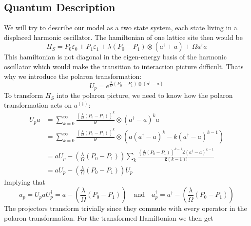 	\subsection{Quantum Description}
	We will try to describe our model as a two state system, each state living in a displaced harmonic oscillator. The hamiltonian of one lattice site then would be
	\begin{equation}
		H_S =	P_0 \varepsilon_0 + P_1 \varepsilon_1 + \lambda (P_0 - P_1) \otimes (a^\dagger  + a) + \Omega a^\dagger a
	\end{equation}
	This hamiltonian is not diagonal in the eigen-energy basis of the harmonic oscillator which would make the transition to interaction picture difficult. Thats why we introduce the polaron transformation:
	\begin{equation}
		U_p =	e^{\frac{\lambda}{\Omega} (P_0 - P_1) \otimes (a^\dagger - a)}
	\end{equation}
	To transform $H_S$ into the polaron picture, we need to know how the polaron transformation acts on $a^{(\dagger)}$:
	\begin{align}
		U_p a &=	\sum_{k=0}^{\infty} \frac{\left(\frac{\lambda}{\Omega} (P_0 - P_1)\right)^k }{k!} \otimes (a^{\dagger} - a)^k a \\
		&=	\sum_{k=0}^{\infty} \frac{\left(\frac{\lambda}{\Omega} (P_0 - P_1)\right)^k }{k!} \otimes \left(a(a^{\dagger} - a)^k - k (a^\dagger - a)^{k-1}\right) \\
		&= a U_p -  \left(\frac{\lambda}{\Omega} (P_0 - P_1)\right)  \sum_{k}^{} \frac{\left(\frac{\lambda}{\Omega} (P_0 - P_1)\right)^{k -1} \not k (a^\dagger - a)^{k-1} }{ \not k (k-1)!} \\
		&= a U_p - \left(\frac{\lambda}{\Omega} (P_0 - P_1)\right) U_p
	\end{align}
	Implying that
	\begin{equation}
		a_p =	U_p a U_p^\dagger = a  - \left(\frac{\lambda}{\Omega} (P_0 - P_1)\right) \quad \text{and} \quad a_p^\dagger =	a^\dagger  - \left(\frac{\lambda}{\Omega} (P_0 - P_1)\right)
	\end{equation}
	The projectors transform trivially since they commute with every operator in the polaron transformation.
	For the transformed Hamiltonian we then get
